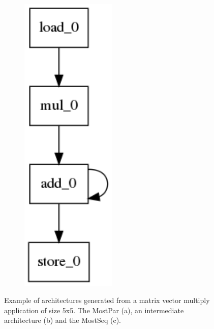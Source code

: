\begin{figure}[ht]
\begin{subfigure}{.3\columnwidth}
  \caption{}
  \label{fig:inter_arch}
\end{subfigure}
\begin{subfigure}{.2\columnwidth}
  \centering
  \includegraphics[width=0.5\textwidth]{images/Architecture_latency_188_schematic.png}
  \caption{}
  \label{fig:most_seq_arch}
\end{subfigure}
    \caption{\small Example of architectures generated from a matrix vector multiply application of size 5x5. The MostPar (a), an intermediate architecture (b) and the MostSeq (c).}
\label{fig:tradeoffs}
\end{figure}


